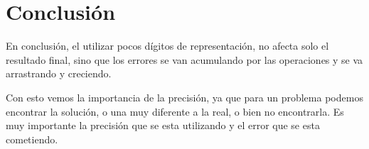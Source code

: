 \documentclass[10pt, a4paper,english,spanish]{article}
\begin{document}
\section{Conclusión}
En conclusión, el utilizar pocos dígitos de representación, no afecta solo el resultado final, sino que los errores se van acumulando por las operaciones y se va arrastrando y creciendo. 

Con esto vemos la importancia de la precisión, ya que para un problema podemos encontrar la solución, o una muy diferente a la real, o bien no encontrarla.
Es muy importante la precisión que se esta utilizando y el error que se esta cometiendo.
\end{document}
